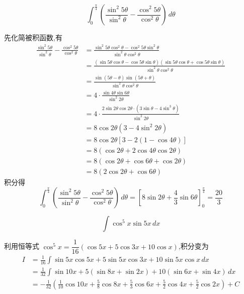 \begin{questions}
    \question 
    \[ 
    \int_{0}^{\frac{\pi}{4}} \left( \frac{\sin^2 5\theta}{\sin^2 \theta} - \frac{\cos^2 5\theta}{\cos^2 \theta} \right) \,d\theta 
    \]
    \begin{solution}
        先化简被积函数,有
        \begin{align*}
        \frac{\sin^2 5\theta}{\sin^2 \theta} - \frac{\cos^2 5\theta}{\cos^2 \theta} 
        &= \frac{\sin^2 5\theta \cos^2 \theta - \cos^2 5\theta \sin^2 \theta}{\sin^2 \theta \cos^2 \theta} \\
        &= \frac{(\sin 5\theta \cos \theta - \cos 5\theta \sin \theta)(\sin 5\theta \cos \theta + \cos 5\theta \sin \theta)}{\sin^2 \theta \cos^2 \theta} \\
        &= \frac{\sin(5\theta - \theta) \sin(5\theta + \theta)}{\sin^2 \theta \cos^2 \theta} \\
        &= 4\cdot \frac{\sin 4\theta \sin 6\theta }{\sin^2 2\theta} \\
        &= 4\cdot \frac{2\sin 2\theta \cos 2\theta \cdot (3\sin \theta -4 \sin^3 \theta)}{\sin^2 2\theta} \\
        &= 8 \cos 2\theta (3 - 4\sin^2 2\theta) \\
        &= 8 \cos 2\theta [3 - 2(1 - \cos 4\theta)]  \\
        &= 8 ( \cos 2\theta + 2\cos 4\theta \cos 2\theta)  \\
        &= 8 ( \cos 2\theta + \cos 6\theta + \cos 2\theta) \\
        &= 8 ( 2\cos 2\theta + \cos 6\theta )
        \end{align*}
        积分得
        \[
        \int_{0}^{\frac{\pi}{4}} \left( \frac{\sin^2 5\theta}{\sin^2 \theta} - \frac{\cos^2 5\theta}{\cos^2 \theta} \right) \,d\theta 
        = \left[ 8\sin 2\theta + \frac{4}{3}\sin 6\theta \right]_{0}^{\frac{\pi}{4}} 
        = \frac{20}{3} 
        \]
    \end{solution}

    \question
    \[
    \int \cos^5 x \sin 5x \, dx
    \]
    \begin{solution}
        利用恒等式 $\cos^5 x = \dfrac{1}{16}(\cos 5x + 5\cos 3x + 10\cos x)$,积分变为
        \begin{align*}
        I &= \frac{1}{16} \int \sin 5x \cos 5x + 5\sin 5x \cos 3x + 10\sin 5x \cos x \, dx \\
        &= \frac{1}{32} \int \sin 10x + 5(\sin 8x + \sin 2x) + 10(\sin 6x + \sin 4x) \, dx \\
        &= -\frac{1}{32} \left( \frac{1}{10}\cos 10x + \frac{5}{8}\cos 8x + \frac{5}{3}\cos 6x + \frac{5}{2}\cos 4x + \frac{5}{2}\cos 2x \right)+ C
        \end{align*}
    \end{solution}


\end{questions}

